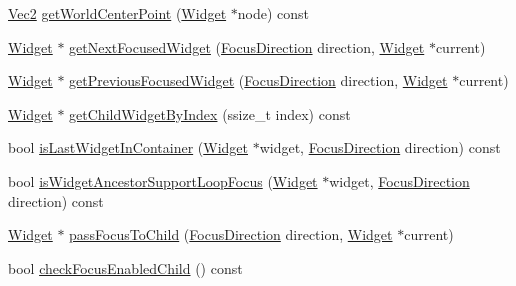 \begin{DoxyCompactItemize}
\item 
\hyperlink{classVec2}{Vec2} \hyperlink{classui_1_1Layout_af1792e929add190f4d14bef493139e5d}{get\+World\+Center\+Point} (\hyperlink{classui_1_1Widget}{Widget} $\ast$node) const
\item 
\hyperlink{classui_1_1Widget}{Widget} $\ast$ \hyperlink{classui_1_1Layout_a0f108cfb92f237c056d8f61e3f6e3ca5}{get\+Next\+Focused\+Widget} (\hyperlink{classui_1_1Widget_a8ae8e8fc793a04a87584205cd1e8a8a5}{Focus\+Direction} direction, \hyperlink{classui_1_1Widget}{Widget} $\ast$current)
\item 
\hyperlink{classui_1_1Widget}{Widget} $\ast$ \hyperlink{classui_1_1Layout_a1fed47b10c16b28b08c8cac5032f7249}{get\+Previous\+Focused\+Widget} (\hyperlink{classui_1_1Widget_a8ae8e8fc793a04a87584205cd1e8a8a5}{Focus\+Direction} direction, \hyperlink{classui_1_1Widget}{Widget} $\ast$current)
\item 
\hyperlink{classui_1_1Widget}{Widget} $\ast$ \hyperlink{classui_1_1Layout_a6c74f237486545399e9636e54f355444}{get\+Child\+Widget\+By\+Index} (ssize\+\_\+t index) const
\item 
bool \hyperlink{classui_1_1Layout_a9e1c7e418530e4aab91e387af02afd41}{is\+Last\+Widget\+In\+Container} (\hyperlink{classui_1_1Widget}{Widget} $\ast$widget, \hyperlink{classui_1_1Widget_a8ae8e8fc793a04a87584205cd1e8a8a5}{Focus\+Direction} direction) const
\item 
bool \hyperlink{classui_1_1Layout_a3cfeefdfb70916a5673b337ea5b97666}{is\+Widget\+Ancestor\+Support\+Loop\+Focus} (\hyperlink{classui_1_1Widget}{Widget} $\ast$widget, \hyperlink{classui_1_1Widget_a8ae8e8fc793a04a87584205cd1e8a8a5}{Focus\+Direction} direction) const
\item 
\hyperlink{classui_1_1Widget}{Widget} $\ast$ \hyperlink{classui_1_1Layout_ade484ea5501c2866bf72bd35d6aa14ff}{pass\+Focus\+To\+Child} (\hyperlink{classui_1_1Widget_a8ae8e8fc793a04a87584205cd1e8a8a5}{Focus\+Direction} direction, \hyperlink{classui_1_1Widget}{Widget} $\ast$current)
\item 
bool \hyperlink{classui_1_1Layout_a54ff2aaad412b2ac3503fb75d9cb34bf}{check\+Focus\+Enabled\+Child} () const
\end{DoxyCompactItemize}

